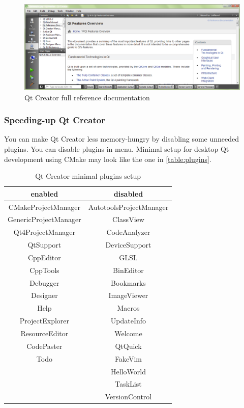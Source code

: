 \begin{figure}[ht]
\centering
\includegraphics[width=14.5cm]{graphics/laboratory/06-qtcreator-help-full.png}
\caption{Qt Creator full reference documentation}\label{figure:qtcreatorhelpfull}
\end{figure}

\subsubsection{Speeding-up Qt Creator}
You can make Qt Creator less memory-hungry by disabling some unneeded plugins. You can disable plugins in menu. Minimal setup for desktop Qt development using CMake may look like the one in \autoref{table:plugins}.

\begin{table}[ht]
\begin{center}
\caption{Qt Creator minimal plugins setup}\label{table:plugins}
\begin{tabular}{c | c}
enabled & disabled \\
\hline
CMakeProjectManager & AutotoolsProjectManager \\
GenericProjectManager & ClassView \\
Qt4ProjectManager & CodeAnalyzer \\
QtSupport & DeviceSupport \\
CppEditor & GLSL \\
CppTools & BinEditor \\
Debugger & Bookmarks \\
Designer & ImageViewer \\
Help & Macros \\
ProjectExplorer & UpdateInfo \\
ResourceEditor & Welcome \\
CodePaster & QtQuick \\
Todo & FakeVim \\
 & HelloWorld \\
 & TaskList \\
 & VersionControl 
\end{tabular}
\end{center}
\end{table}

